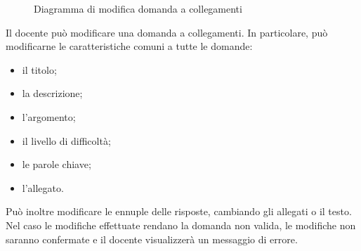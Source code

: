 \documentclass[a4paper, titlepage]{article}
\begin{document}
\newpage
{}
\begin{figure}[H]
	\centering
	\noindent{}
	\caption{Diagramma di modifica domanda a collegamenti}
\end{figure}
Il docente può modificare una domanda a collegamenti. In particolare, può modificarne le caratteristiche comuni a tutte le domande:
\begin{itemize}
	\item il titolo;
	\item la descrizione;
	\item l’argomento;
	\item il livello di difficoltà; 
	\item le parole chiave;
	\item l’allegato.
\end{itemize}
Può inoltre modificare le ennuple delle risposte, cambiando gli allegati o il testo. 
Nel caso le modifiche effettuate rendano la domanda non valida, le modifiche non saranno confermate e il docente visualizzerà un messaggio di errore.
\end{document}
